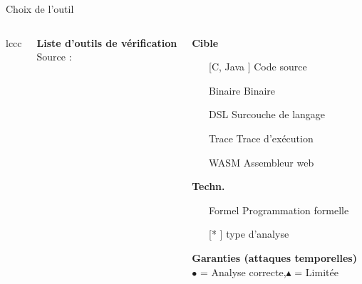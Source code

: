 \documentclass{backend/backend}
\begin{document}
\begin{frame}{Choix de l'outil}
\begin{columns}
\begin{tabular}{lccc}
        \\
        \\
        \\
        \\
        \\
        \\
        \\
        \bottomrule
    \end{tabular}

    \textbf{Liste d’outils de vérification}\\[1ex]
    Source : \cite{notThatHardCT}\\[2ex]
    \begin{scriptsize}
        
        \textbf{Cible}
        \begin{itemize}
        \item[[C, Java]] Code source
        \item[Binaire] Binaire
        \item[DSL] Surcouche de langage
        \item[Trace] Trace d'exécution
        \item[WASM] Assembleur web
    \end{itemize}
    \textbf{Techn.}
    \begin{itemize}
        \item[Formel] Programmation formelle 
        \item[[*]] type d'analyse
    \end{itemize}
    \textbf{Garanties (attaques temporelles)}\\
        $\bullet$ = Analyse correcte,$\blacktriangle$ =  Limitée
    \end{scriptsize}
    \end{columns}
\end{frame}
\end{document}

